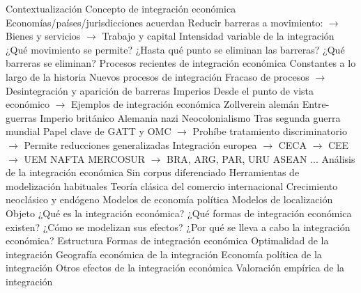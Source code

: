 \documentclass{nuevotema}
\begin{document}
\esquemalargo



























\begin{esquemal}
	\1[] 
		\2 Contextualización
			\3 Concepto de integración económica
				\4 Economías/países/jurisdicciones acuerdan
				\4[] Reducir barreras a movimiento:
				\4[] $\to$ Bienes y servicios
				\4[] $\to$ Trabajo y capital
				\4 Intensidad variable de la integración
				\4[] ¿Qué movimiento se permite?
				\4[] ¿Hasta qué punto se eliminan las barreras?
				\4[] ¿Qué barreras se eliminan?
			\3 Procesos recientes de integración económica
				\4 Constantes a lo largo de la historia
				\4[] Nuevos procesos de integración
				\4[] Fracaso de procesos
				\4[] $\to$ Desintegración y aparición de barreras
				\4 Imperios
				\4[] Desde el punto de vista económico
				\4[] $\to$ Ejemplos de integración económica
				\4[] Zollverein alemán
				\4 Entre-guerras
				\4[] Imperio británico
				\4[] Alemania nazi
				\4[] Neocolonialismo
				\4 Tras segunda guerra mundial
				\4[] Papel clave de GATT y OMC
				\4[] $\to$ Prohíbe tratamiento discriminatorio
				\4[] $\to$ Permite reducciones generalizadas
				\4[] Integración europea
				\4[] $\to$ CECA $\to$ CEE $\to$ UEM
				\4[] NAFTA
				\4[] MERCOSUR
				\4[] $\to$ BRA, ARG, PAR, URU
				\4[] ASEAN
				\4[] ...
			\3 Análisis de la integración económica
				\4 Sin corpus diferenciado
				\4 Herramientas de modelización habituales
				\4[] Teoría clásica del comercio internacional
				\4[] Crecimiento neoclásico y endógeno
				\4[] Modelos de economía política
				\4[] Modelos de localización
		\2 Objeto
			\3 ¿Qué es la integración económica?
			\3 ¿Qué formas de integración económica existen?
			\3 ¿Cómo se modelizan sus efectos?
			\3 ¿Por qué se lleva a cabo la integración económica?
		\2 Estructura
			\3 Formas de integración económica
			\3 Optimalidad de la integración
			\3 Geografía económica de la integración
			\3 Economía política de la integración
			\3 Otros efectos de la integración económica
			\3 Valoración empírica de la integración

\end{esquemal}
\end{document}
